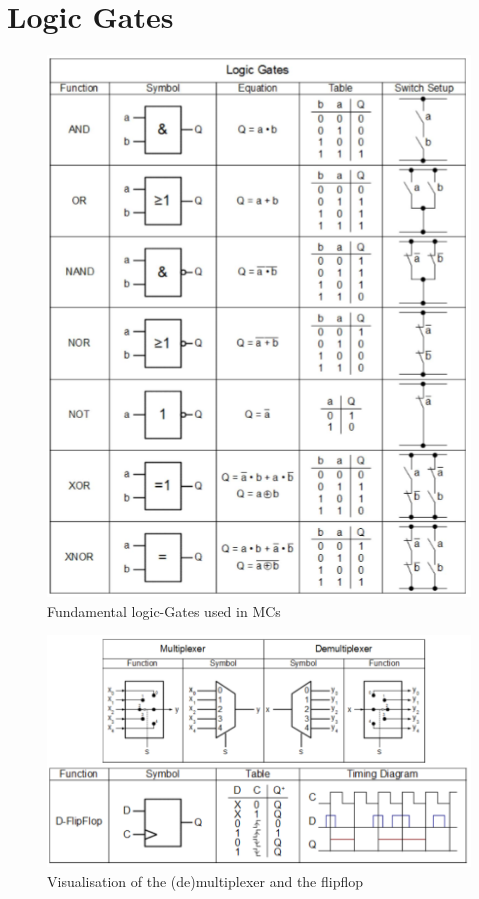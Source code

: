 \documentclass[a4paper, 11pt, nofootinbib]{book}
\begin{document}
\section{Logic Gates}
\begin{figure}[htb]
	\centering
	\includegraphics[keepaspectratio=true,height=25\baselineskip]{logicGates.PNG}
	\caption{Fundamental logic-Gates used in MCs}
	\label{fig:logicGates}
\end{figure}

\begin{figure}[htb]
	\centering
	\includegraphics[keepaspectratio=true,height=15\baselineskip]{flipflop.PNG}
	\caption{Visualisation of the (de)multiplexer and the flipflop}
	\label{fig:multFlip}
\end{figure}
\end{document}
